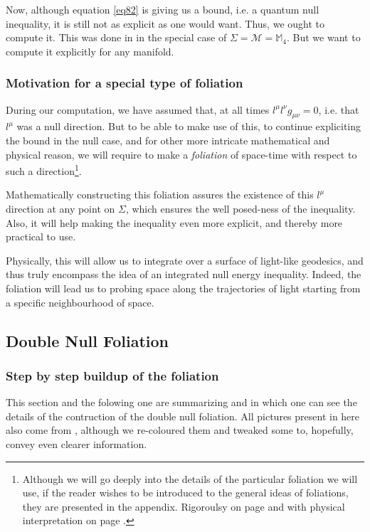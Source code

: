 \documentclass[a4paper,11pt]{article}
\numberwithin{equation}{section}
\theoremstyle{definition}
\begin{document}
Now, although equation \ref{eq82} is giving us a bound, i.e. a quantum null inequality, it is still not as explicit as one would want. Thus, we ought to compute it. This was done in \cite{DSNEC} in the special case of $\Sigma=\mathcal{M}=\mathbb{M}_4$. But we want to compute it explicitly for any manifold.
\subsubsection{Motivation for a special type of foliation}
During our computation, we have assumed that, at all times $l^\mu l^\nu g_{\mu\nu}=0$, i.e. that $l^\mu$ was a null direction. But to be able to make use of this, to continue expliciting the bound in the null case, and for other more intricate mathematical and physical reason, we will require to make a \emph{foliation} of space-time with respect to such a direction\footnote{Although we will go deeply into the details of the particular foliation we will use, if the reader wishes to be introduced to the general ideas of foliations, they are presented in the appendix. Rigoroulsy on page \pageref{MatFoli} and with physical interpretation on page \pageref{PhyFoli}.}.

Mathematically constructing this foliation assures the existence of this $l^\mu$ direction at any point on $\Sigma$, which ensures the well posed-ness of the inequality. Also, it will help making the inequality even more explicit, and thereby more practical to use.

Physically, this will allow us to integrate over a surface of light-like geodesics, and thus truly encompass the idea of an integrated null energy inequality. Indeed, the foliation will lead us to probing space along the trajectories of light starting from a specific neighbourhood of space.



\subsection{Double Null Foliation}
\subsubsection{Step by step buildup of the foliation}
This section and the folowing one are summarizing \cite{Chris} and \cite{Art} in which one can see the details of the contruction of the double null foliation. All pictures present in here also come from \cite{Art}, although we re-coloured them and tweaked some to, hopefully, convey even clearer information.
\end{document}
